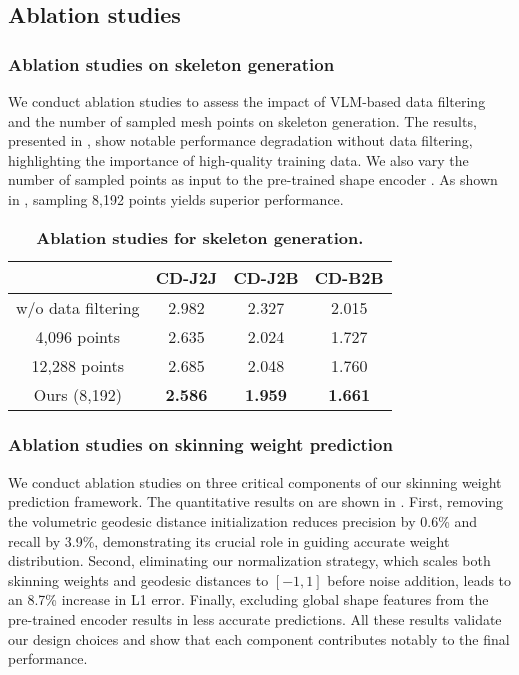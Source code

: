 \vspace{-5pt}
\subsection{Ablation studies}

\subsubsection{Ablation studies on skeleton generation}
We conduct ablation studies to assess the impact of VLM-based data filtering and the number of sampled mesh points on skeleton generation. 
The results, presented in , show notable performance degradation without data filtering, highlighting the importance of high-quality training data. We also vary the number of sampled points as input to the pre-trained shape encoder \cite{zhao2024michelangelo}. As shown in , sampling 8,192 points yields superior performance.

\begin{table}
  \caption{\textbf{Ablation studies for skeleton generation.}}
  \label{ablation_skel}
  \centering
  \begin{tabular}{cccc}
    \toprule
      &  CD-J2J  & CD-J2B & CD-B2B \\
    \midrule
    w/o data filtering   & 2.982 & 2.327  & 2.015 \\
    \midrule
    4,096 points & 2.635 & 2.024  & 1.727 \\
    12,288 points & 2.685 & 2.048  & 1.760 \\
    Ours (8,192)      & \textbf{2.586} & \textbf{1.959} & \textbf{1.661}   
    \\
    \bottomrule
  \end{tabular}
\end{table}

\subsubsection{Ablation studies on skinning weight prediction}
\label{ablate_skin} 
We conduct ablation studies on three critical components of our skinning weight prediction framework. The quantitative results on \res{} are shown in . First, removing the volumetric geodesic distance initialization reduces precision by 0.6\% and recall by 3.9\%, demonstrating its crucial role in guiding accurate weight distribution. Second, eliminating our normalization strategy, which scales both skinning weights and geodesic distances to \([-1, 1]\) before noise addition, leads to an 8.7\% increase in L1 error. Finally, excluding global shape features from the pre-trained encoder \cite{zhao2024michelangelo} results in less accurate predictions. All these results validate our design choices and show that each component contributes notably to the final performance.

